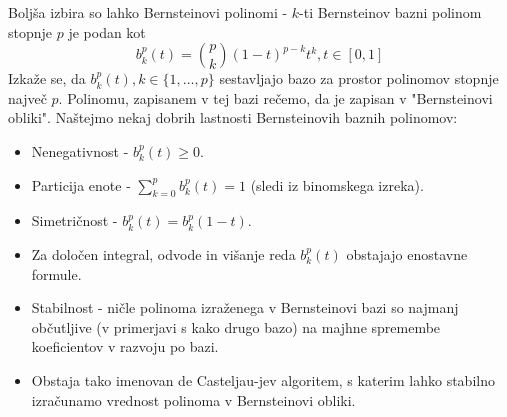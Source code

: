 \documentclass{article}
\begin{document}
Boljša izbira so lahko Bernsteinovi polinomi - $k$-ti Bernsteinov bazni polinom stopnje $p$ je podan kot 
\begin{equation}
b_k^p (t) = \binom{p}{k} (1-t)^{p-k} t^k, t \in [0,1]
\end{equation}
Izkaže se, da $b_k^p(t), k \in \{1, \dots , p\}$ sestavljajo bazo za prostor polinomov stopnje največ $p$. Polinomu, zapisanem v tej bazi rečemo, da je zapisan v "Bernsteinovi obliki". Naštejmo nekaj dobrih lastnosti Bernsteinovih baznih polinomov:
\begin{itemize}
\item Nenegativnost - $b_k^p(t) \geq 0$.
\item Particija enote - $\sum_{k=0}^p b_k^p (t) = 1$ (sledi iz binomskega izreka).
\item Simetričnost - $b_k^p(t) = b_k^p(1-t)$.
\item Za določen integral, odvode in višanje reda $b_k^p(t)$ obstajajo enostavne formule.
\item Stabilnost - ničle polinoma izraženega v Bernsteinovi bazi so najmanj občutljive (v primerjavi s kako drugo bazo) na majhne spremembe koeficientov v razvoju po bazi. \cite{stabilnost}
\item Obstaja tako imenovan de Casteljau-jev algoritem, s katerim lahko stabilno izračunamo vrednost polinoma v Bernsteinovi obliki.
\end{itemize}
\end{document}
